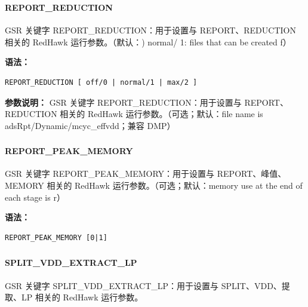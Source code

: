 \subsubsection{}
\paragraph*{REPORT_REDUCTION}

GSR 关键字 REPORT_REDUCTION：用于设置与 REPORT、REDUCTION 相关的 RedHawk 运行参数。（默认：) normal/ 1: files that can be created f）

\textbf{语法：}
\begin{lstlisting}
REPORT_REDUCTION [ off/0 | normal/1 | max/2 ]
\end{lstlisting}

\textbf{参数说明：}
GSR 关键字 REPORT\_REDUCTION：用于设置与 REPORT、REDUCTION 相关的 RedHawk 运行参数。（可选；默认：file name is adsRpt/Dynamic/mcyc\_effvdd；兼容 DMP）

\subsubsection{}
\paragraph*{REPORT_PEAK_MEMORY}

GSR 关键字 REPORT_PEAK_MEMORY：用于设置与 REPORT、峰值、MEMORY 相关的 RedHawk 运行参数。（可选；默认：memory use at the end of each stage is r）

\textbf{语法：}
\begin{lstlisting}
REPORT_PEAK_MEMORY [0|1]
\end{lstlisting}

\subsubsection{}
\paragraph*{SPLIT_VDD_EXTRACT_LP}

GSR 关键字 SPLIT_VDD_EXTRACT_LP：用于设置与 SPLIT、VDD、提取、LP 相关的 RedHawk 运行参数。

\subsubsection{}

